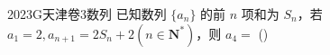 
\begin{problem}{2023}{G}{天津卷}{3}{数列}
已知数列 $\{a_n\}$ 的前 $n$ 项和为 $S_n$，若 $a_1=2, a_{n+1}=2S_n+2(n\in \mathbf{N}^*)$，则 $a_4=$
(\hspace{1cm})
\begin{choices}
\end{choices}
\end{problem}